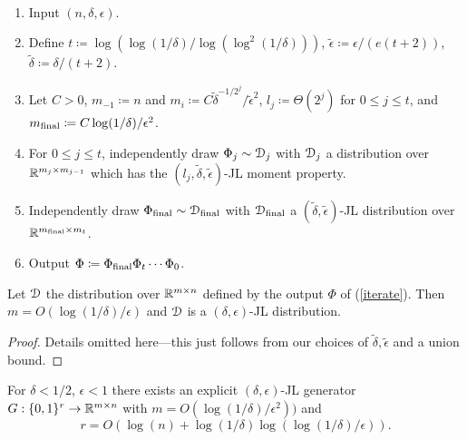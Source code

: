 \begin{algorithm}
  \label{iterate}
  \ \begin{enumerate}
  \item Input $(n,\delta,\epsilon)$.
  \item Define $t \coloneqq
    \log(\log(1/\delta)/\log(\log^2(1/\delta)))$, $\tilde\epsilon
    \coloneqq \epsilon/(e(t+2))$, $\tilde\delta \coloneqq
    \delta/(t+2)$.
  \item Let $C > 0$, $m_{-1} \coloneqq n$ and $m_i \coloneqq
    C\tilde\delta^{-1/2^j}/\tilde\epsilon^2$, $l_j \coloneqq
    \Theta(2^j)$ for $0 \le j \le t$, and $m_{\text{final}} \coloneqq
    C\log(1/\delta)/\epsilon^2$.
  \item For $0 \le j \le t$, independently draw $\Phi_j \sim \mathcal{D}_j$
    with $\mathcal{D}_j$ a distribution over $\mathbb{R}^{m_j \times m_{j-1}}$ which
    has the $(l_j, \tilde\delta, \tilde\epsilon)$-JL moment property.
  \item Independently draw $\Phi_{\text{final}} \sim \mathcal{D}_{\text{final}}$ with
    $\mathcal{D}_{\text{final}}$ a $(\tilde\delta,\tilde\epsilon)$-JL distribution over
    $\mathbb{R}^{m_{\text{final}} \times m_t}$.
  \item Output $\Phi \coloneqq \Phi_{\text{final}} \Phi_t \cdots \Phi_0$.
  \end{enumerate}
\end{algorithm}

\begin{proposition}
  \label{iterative-JL}
  Let $\mathcal{D}$ the distribution over $\mathbb{R}^{m \times n}$ defined by the
  output $\Phi$ of (\ref{iterate}). Then $m =
  O(\log(1/\delta)/\epsilon)$ and $\mathcal{D}$ is a $(\delta,\epsilon)$-JL
  distribution.
\end{proposition}

\begin{proof}
  Details omitted here---this just follows from our choices of
  $\tilde\delta,\tilde\epsilon$ and a union bound.
\end{proof}

\begin{theorem}
  \label{jelani}
  For $\delta < 1/2$, $\epsilon < 1$ there exists an explicit
  $(\delta,\epsilon)$-JL generator $G : \{0,1\}^r \to \mathbb{R}^{m \times n}$
  with $m = O(\log(1/\delta)/\epsilon^2))$ and
  \[
  r = O(\log(n) + \log(1/\delta)\log(\log(1/\delta)/\epsilon)).
  \]
\end{theorem}

